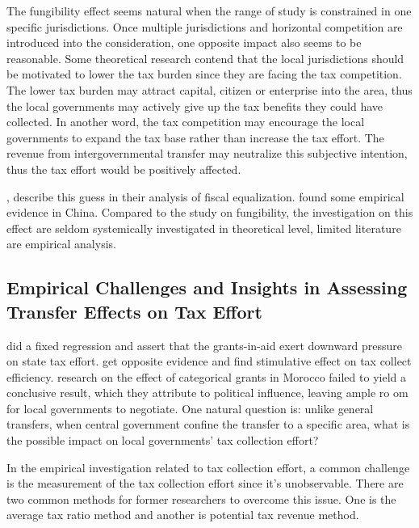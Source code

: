 The fungibility effect seems natural when the range of study is constrained in one specific jurisdictions. Once multiple jurisdictions and horizontal competition are introduced into the consideration, one opposite impact also seems to be reasonable. Some theoretical research contend that the local jurisdictions should be motivated to lower the tax burden since they are facing the tax competition. The lower tax burden may attract capital, citizen or enterprise into the area, thus the local governments may actively give up the tax benefits they could have collected. In another word, the tax competition may encourage the local governments to expand the tax base rather than increase the tax effort. The revenue from intergovernmental transfer may neutralize this subjective intention, thus the tax effort would be positively affected.

\textcite{2010Theefficiency}, \textcite{2006Theincentive} describe this guess in their analysis of fiscal equalization. \textcite{2011Intergovernmental}
found some empirical evidence in China. Compared to the study on fungibility, the investigation on this effect are seldom systemically investigated in theoretical level, limited literature are empirical analysis.

\subsection{Empirical Challenges and Insights in Assessing Transfer Effects on Tax Effort}

\textcite{nicholson2008fiscal} did a fixed regression and assert that the grants-in-aid exert downward pressure on state tax effort. \textcite{dash2013intergovernmental}get opposite evidence and find stimulative effect on tax collect efficiency. \textcite{2016The} research on the effect of categorical grants in Morocco failed to yield a conclusive result, which they attribute to political influence, leaving ample ro om for local governments to negotiate. One natural question is: unlike general transfers, when central government confine the transfer to a specific area, what is the possible impact on local governments' tax collection effort?

In the empirical investigation related to tax collection effort, a common challenge is the measurement of the tax collection effort since it's unobservable. There are two common methods for former researchers to overcome this issue. One is the average tax ratio method and another is potential tax revenue method.

